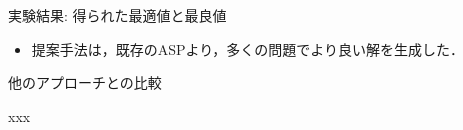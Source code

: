 \documentclass[11pt,dvipdfmx]{beamer}
\begin{document}
\begin{frame}{実験結果: 得られた最適値と最良値}
  \begin{tableA}
    
  \end{tableA}
  \begin{itemize}
  \item 提案手法は，既存のASPより，多くの問題でより良い解を生成した．
  \end{itemize}
\end{frame}
\begin{frame}{他のアプローチとの比較}

xxx
  
\end{frame}
\end{document}

